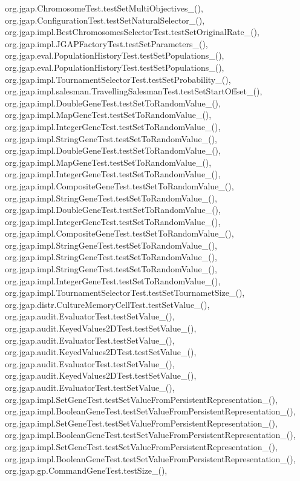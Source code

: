 org.\-jgap.\-Chromosome\-Test.\-test\-Set\-Multi\-Objectives\-\_(), org.\-jgap.\-Configuration\-Test.\-test\-Set\-Natural\-Selector\-\_(), org.\-jgap.\-impl.\-Best\-Chromosomes\-Selector\-Test.\-test\-Set\-Original\-Rate\-\_(), org.\-jgap.\-impl.\-J\-G\-A\-P\-Factory\-Test.\-test\-Set\-Parameters\-\_(), org.\-jgap.\-eval.\-Population\-History\-Test.\-test\-Set\-Populations\-\_(), org.\-jgap.\-eval.\-Population\-History\-Test.\-test\-Set\-Populations\-\_(), org.\-jgap.\-impl.\-Tournament\-Selector\-Test.\-test\-Set\-Probability\-\_(), org.\-jgap.\-impl.\-salesman.\-Travelling\-Salesman\-Test.\-test\-Set\-Start\-Offset\-\_(), org.\-jgap.\-impl.\-Double\-Gene\-Test.\-test\-Set\-To\-Random\-Value\-\_(), org.\-jgap.\-impl.\-Map\-Gene\-Test.\-test\-Set\-To\-Random\-Value\-\_(), org.\-jgap.\-impl.\-Integer\-Gene\-Test.\-test\-Set\-To\-Random\-Value\-\_(), org.\-jgap.\-impl.\-String\-Gene\-Test.\-test\-Set\-To\-Random\-Value\-\_(), org.\-jgap.\-impl.\-Double\-Gene\-Test.\-test\-Set\-To\-Random\-Value\-\_(), org.\-jgap.\-impl.\-Map\-Gene\-Test.\-test\-Set\-To\-Random\-Value\-\_(), org.\-jgap.\-impl.\-Integer\-Gene\-Test.\-test\-Set\-To\-Random\-Value\-\_(), org.\-jgap.\-impl.\-Composite\-Gene\-Test.\-test\-Set\-To\-Random\-Value\-\_(), org.\-jgap.\-impl.\-String\-Gene\-Test.\-test\-Set\-To\-Random\-Value\-\_(), org.\-jgap.\-impl.\-Double\-Gene\-Test.\-test\-Set\-To\-Random\-Value\-\_(), org.\-jgap.\-impl.\-Integer\-Gene\-Test.\-test\-Set\-To\-Random\-Value\-\_(), org.\-jgap.\-impl.\-Composite\-Gene\-Test.\-test\-Set\-To\-Random\-Value\-\_(), org.\-jgap.\-impl.\-String\-Gene\-Test.\-test\-Set\-To\-Random\-Value\-\_(), org.\-jgap.\-impl.\-String\-Gene\-Test.\-test\-Set\-To\-Random\-Value\-\_(), org.\-jgap.\-impl.\-String\-Gene\-Test.\-test\-Set\-To\-Random\-Value\-\_(), org.\-jgap.\-impl.\-Integer\-Gene\-Test.\-test\-Set\-To\-Random\-Value\-\_(), org.\-jgap.\-impl.\-Tournament\-Selector\-Test.\-test\-Set\-Tournamet\-Size\-\_(), org.\-jgap.\-distr.\-Culture\-Memory\-Cell\-Test.\-test\-Set\-Value\-\_(), org.\-jgap.\-audit.\-Evaluator\-Test.\-test\-Set\-Value\-\_(), org.\-jgap.\-audit.\-Keyed\-Values2\-D\-Test.\-test\-Set\-Value\-\_(), org.\-jgap.\-audit.\-Evaluator\-Test.\-test\-Set\-Value\-\_(), org.\-jgap.\-audit.\-Keyed\-Values2\-D\-Test.\-test\-Set\-Value\-\_(), org.\-jgap.\-audit.\-Evaluator\-Test.\-test\-Set\-Value\-\_(), org.\-jgap.\-audit.\-Keyed\-Values2\-D\-Test.\-test\-Set\-Value\-\_(), org.\-jgap.\-audit.\-Evaluator\-Test.\-test\-Set\-Value\-\_(), org.\-jgap.\-impl.\-Set\-Gene\-Test.\-test\-Set\-Value\-From\-Persistent\-Representation\-\_(), org.\-jgap.\-impl.\-Boolean\-Gene\-Test.\-test\-Set\-Value\-From\-Persistent\-Representation\-\_(), org.\-jgap.\-impl.\-Set\-Gene\-Test.\-test\-Set\-Value\-From\-Persistent\-Representation\-\_(), org.\-jgap.\-impl.\-Boolean\-Gene\-Test.\-test\-Set\-Value\-From\-Persistent\-Representation\-\_(), org.\-jgap.\-impl.\-Set\-Gene\-Test.\-test\-Set\-Value\-From\-Persistent\-Representation\-\_(), org.\-jgap.\-impl.\-Boolean\-Gene\-Test.\-test\-Set\-Value\-From\-Persistent\-Representation\-\_(), org.\-jgap.\-gp.\-Command\-Gene\-Test.\-test\-Size\-\_(), 